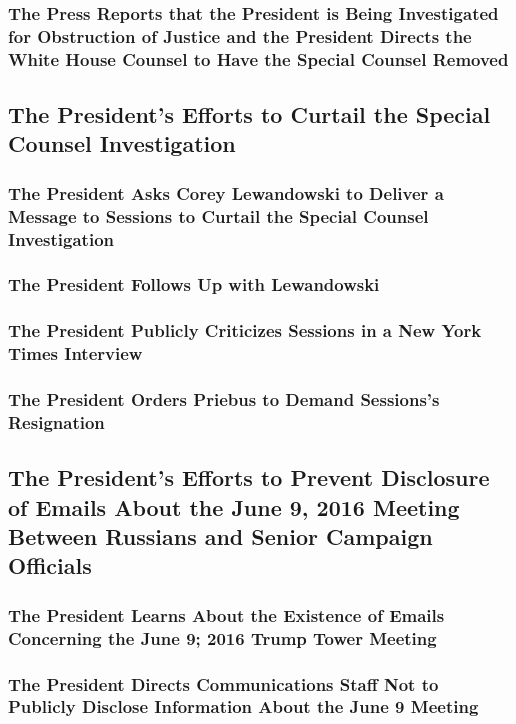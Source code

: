 \subsubsection{The Press Reports that the President is Being Investigated for Obstruction of Justice and the President Directs the White House Counsel to Have the Special Counsel Removed}

\subsection{The President’s Efforts to Curtail the Special Counsel Investigation}

\subsubsection{The President Asks Corey Lewandowski to Deliver a Message to Sessions to Curtail the Special Counsel Investigation}

\subsubsection{The President Follows Up with Lewandowski}

\subsubsection{The President Publicly Criticizes Sessions in a New York Times Interview}

\subsubsection{The President Orders Priebus to Demand Sessions’s Resignation}

\subsection{The President’s Efforts to Prevent Disclosure of Emails About the June 9, 2016 Meeting Between Russians and Senior Campaign Officials}

\subsubsection{The President Learns About the Existence of Emails Concerning the June 9; 2016 Trump Tower Meeting}

\subsubsection{The President Directs Communications Staff Not to Publicly Disclose Information About the June 9 Meeting}


